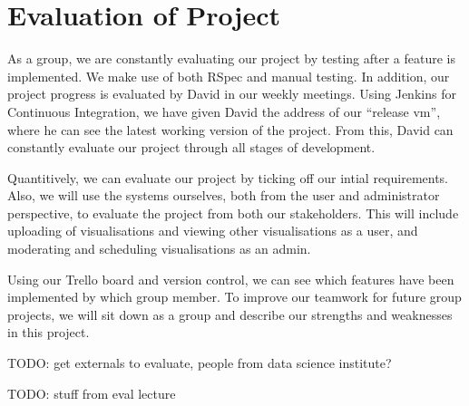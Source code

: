 \documentclass[a4paper]{article}
\begin{document}
\section{Evaluation of Project}
As a group, we are constantly evaluating our project by testing after a 
feature is implemented. We make use of both RSpec and manual testing. In 
addition, our project progress is evaluated by David in our weekly 
meetings. Using Jenkins for Continuous Integration, we have given David
the address of our ``release vm'', where he can see the latest working 
version of the project. From this, David can constantly evaluate our project 
through all stages of development.

Quantitively, we can evaluate our project by ticking off our intial 
requirements. Also, we will use the systems ourselves, both from the user 
and administrator perspective, to evaluate the project from both our stakeholders.
This will include uploading of visualisations and viewing other visualisations as a
user, and moderating and scheduling visualisations as an admin.

Using our Trello board and version control, we can see which features have been 
implemented by which group member. To improve our teamwork for future group 
projects, we will sit down as a group and describe our strengths and weaknesses in 
this project.

TODO: get externals to evaluate, people from data science institute? 

TODO: stuff from eval lecture
\end{document}
